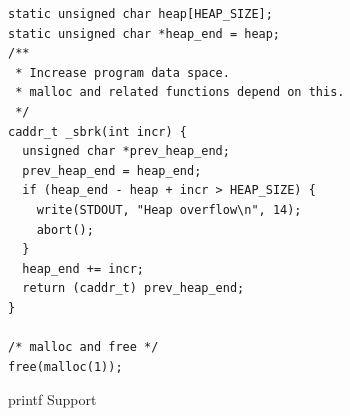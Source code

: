 \begin{figure}
  \vspace{-10pt}
  \begin{center}
    \lstset{language=[ANSI]C}
    \begin{lstlisting}
static unsigned char heap[HEAP_SIZE];
static unsigned char *heap_end = heap;
/**
 * Increase program data space.
 * malloc and related functions depend on this.
 */
caddr_t _sbrk(int incr) {
  unsigned char *prev_heap_end;
  prev_heap_end = heap_end;
  if (heap_end - heap + incr > HEAP_SIZE) {
    write(STDOUT, "Heap overflow\n", 14);
    abort();
  }
  heap_end += incr;
  return (caddr_t) prev_heap_end;
}

/* malloc and free */
free(malloc(1));
    \end{lstlisting}
    \caption[printf Support]{printf Support}
  \end{center}
  \vspace{-10pt}
\end{figure}

